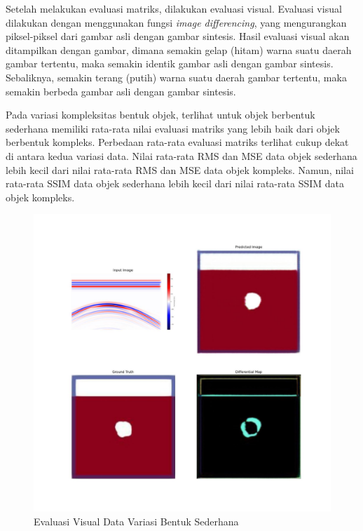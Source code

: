 Setelah melakukan evaluasi matriks, dilakukan evaluasi visual. 
Evaluasi visual dilakukan dengan menggunakan fungsi \emph{image differencing}, yang mengurangkan piksel-piksel dari gambar asli dengan gambar sintesis. 
Hasil evaluasi visual akan ditampilkan dengan gambar, dimana semakin gelap (hitam) warna suatu daerah gambar tertentu, maka semakin identik gambar asli dengan gambar sintesis. 
Sebaliknya, semakin terang (putih) warna suatu daerah gambar tertentu, maka semakin berbeda gambar asli dengan gambar sintesis.

Pada variasi kompleksitas bentuk objek, terlihat untuk objek berbentuk sederhana memiliki rata-rata nilai evaluasi matriks yang lebih baik dari objek berbentuk kompleks. 
Perbedaan rata-rata evaluasi matriks terlihat cukup dekat di antara kedua variasi data.  
Nilai rata-rata RMS dan MSE data objek sederhana lebih kecil dari nilai rata-rata RMS dan MSE data objek kompleks. 
Namun, nilai rata-rata SSIM data objek sederhana lebih kecil dari nilai rata-rata SSIM data objek kompleks. 

\begin{figure}[ht]
  \centering
  \includegraphics[scale=0.15]{gambar/diffMapSederhana.jpg}
  \caption{Evaluasi Visual Data Variasi Bentuk Sederhana}
  \label{fig:diffmapsederhana}
\end{figure}

